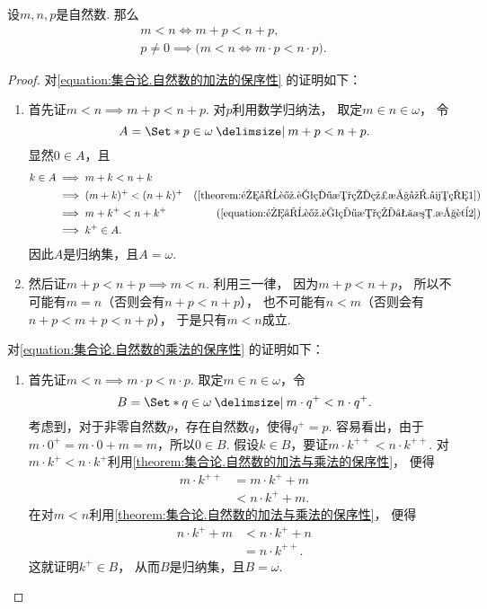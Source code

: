 \begin{theorem}\label{theorem:集合论.自然数的加法与乘法的保序性}
设\(m,n,p\)是自然数.
那么\begin{gather}
	m < n \iff m + p < n + p,
	\label{equation:集合论.自然数的加法的保序性} \\
	p \neq 0 \implies \bigl(
		m < n \iff m \cdot p < n \cdot p
	\bigr).
	\label{equation:集合论.自然数的乘法的保序性}
\end{gather}
\begin{proof}
对\cref{equation:集合论.自然数的加法的保序性} 的证明如下：
\begin{enumerate}
	\item 首先证\(m < n \implies m + p < n + p\).
	对\(p\)利用数学归纳法，
	取定\(m \in n \in \omega\)，
	令\[
		A = \Set*{
			p \in \omega
			\given
			m + p < n + p
		}.
	\]
	显然\(0 \in A\)，且\begin{align*}
		k \in A
		&\implies m+k<n+k \\
		&\implies (m+k)^+<(n+k)^+
			&(\text{\cref{theorem:集合论.自然数的线性序.引理1}}) \\
		&\implies m+k^+<n+k^+
			&(\text{\cref{equation:集合论.自然数的加法.性质2}}) \\
		&\implies k^+ \in A.
	\end{align*}
	因此\(A\)是归纳集，且\(A = \omega\).

	\item 然后证\(m + p < n + p \implies m < n\).
	利用三一律，
	因为\(m + p < n + p\)，
	所以不可能有\(m = n\)（否则会有\(n+p<n+p\)），
	也不可能有\(n < m\)（否则会有\(n+p<m+p<n+p\)），
	于是只有\(m < n\)成立.
\end{enumerate}

对\cref{equation:集合论.自然数的乘法的保序性} 的证明如下：
\begin{enumerate}
	\item 首先证\(m < n \implies m \cdot p < n \cdot p\).
	取定\(m \in n \in \omega\)，令\[
		B = \Set*{
			q \in \omega
			\given
			m \cdot q^+ < n \cdot q^+
		}.
	\]
	考虑到，对于非零自然数\(p\)，存在自然数\(q\)，使得\(q^+ = p\).
	容易看出，由于\(m \cdot 0^+ = m \cdot 0 + m = m\)，所以\(0 \in B\).
	假设\(k \in B\)，要证\(m \cdot k^{++} < n \cdot k^{++}\).
	对\(m \cdot k^+ < n \cdot k^+\)利用\cref{theorem:集合论.自然数的加法与乘法的保序性}，
	便得\begin{align*}
		m \cdot k^{++}
		&= m \cdot k^+ + m \\
		&< n \cdot k^+ + m.
	\end{align*}
	在对\(m < n\)利用\cref{theorem:集合论.自然数的加法与乘法的保序性}，
	便得\begin{align*}
		n \cdot k^+ + m
		&< n \cdot k^+ + n \\
		&= n \cdot k^{++}.
	\end{align*}
	这就证明\(k^+ \in B\)，
	从而\(B\)是归纳集，且\(B = \omega\).


\end{enumerate}
\end{proof}
\end{theorem}
